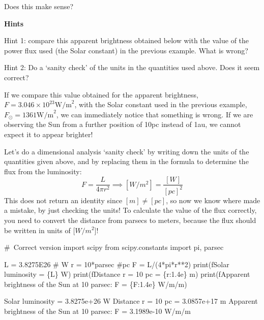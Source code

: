 \documentclass[
  letterpaper,
  DIV=11,
  numbers=noendperiod]{scrreprt}
\newenvironment{Shaded}{\begin{snugshade}}{\end{snugshade}}
\newcommand{\BuiltInTok}[1]{\textcolor[rgb]{0.00,0.23,0.31}{#1}}
\newcommand{\CommentTok}[1]{\textcolor[rgb]{0.37,0.37,0.37}{#1}}
\newcommand{\DecValTok}[1]{\textcolor[rgb]{0.68,0.00,0.00}{#1}}
\newcommand{\FloatTok}[1]{\textcolor[rgb]{0.68,0.00,0.00}{#1}}
\newcommand{\ImportTok}[1]{\textcolor[rgb]{0.00,0.46,0.62}{#1}}
\newcommand{\NormalTok}[1]{\textcolor[rgb]{0.00,0.23,0.31}{#1}}
\newcommand{\OperatorTok}[1]{\textcolor[rgb]{0.37,0.37,0.37}{#1}}
\newcommand{\SpecialCharTok}[1]{\textcolor[rgb]{0.37,0.37,0.37}{#1}}
\newcommand{\SpecialStringTok}[1]{\textcolor[rgb]{0.13,0.47,0.30}{#1}}
\begin{document}
Does this make sense?

\textbf{Hints}

Hint 1: compare this apparent brightness obtained below with the value
of the power flux used (the Solar constant) in the previous example.
What is wrong?

Hint 2: Do a `sanity check' of the units in the quantities used above.
Does it seem correct?

If we compare this value obtained for the apparent brightness,
\(F=3.046\times 10^{23} \mathrm{W/m}^2\), with the Solar constant used
in the previous example, \(F_\odot = 1361 \mathrm{W/m}^2\), we can
immediately notice that something is wrong. If we are observing the Sun
from a further position of 10pc instead of 1au, we cannot expect it to
appear brighter!

Let's do a dimensional analysis `sanity check' by writing down the units
of the quantities given above, and by replacing them in the formula to
determine the flux from the luminosity:
\[ F=\frac{L}{4\pi r^2} \implies [W/m^2] = \frac{[W]}{[pc]^2} \] This
does not return an identity since \([m]\neq [pc]\), so now we know where
made a mistake, by just checking the units! To calculate the value of
the flux correctly, you need to convert the distance from parsecs to
meters, because the flux should be written in units of {[}\(W/m^2\){]}!

\begin{Shaded}
\begin{Highlighting}[]
\CommentTok{\# Correct version}
\ImportTok{import}\NormalTok{ scipy}
\ImportTok{from}\NormalTok{ scipy.constants }\ImportTok{import}\NormalTok{ pi, parsec}

\NormalTok{L }\OperatorTok{=} \FloatTok{3.8275E26} \CommentTok{\# W}
\NormalTok{r }\OperatorTok{=} \DecValTok{10}\OperatorTok{*}\NormalTok{parsec }\CommentTok{\#pc}
\NormalTok{F }\OperatorTok{=}\NormalTok{ L}\OperatorTok{/}\NormalTok{(}\DecValTok{4}\OperatorTok{*}\NormalTok{pi}\OperatorTok{*}\NormalTok{r}\OperatorTok{**}\DecValTok{2}\NormalTok{)}
\BuiltInTok{print}\NormalTok{(}\SpecialStringTok{f\textquotesingle{}Solar luminosity = }\SpecialCharTok{\{}\NormalTok{L}\SpecialCharTok{\}}\SpecialStringTok{ W\textquotesingle{}}\NormalTok{)}
\BuiltInTok{print}\NormalTok{(}\SpecialStringTok{f\textquotesingle{}Distance r = 10 pc = }\SpecialCharTok{\{}\NormalTok{r}\SpecialCharTok{:1.4e\}}\SpecialStringTok{ m\textquotesingle{}}\NormalTok{)}
\BuiltInTok{print}\NormalTok{(}\SpecialStringTok{f\textquotesingle{}Apparent brightness of the Sun at 10 parsec: F = }\SpecialCharTok{\{}\NormalTok{F}\SpecialCharTok{:1.4e\}}\SpecialStringTok{ W/m/m\textquotesingle{}}\NormalTok{)}

\NormalTok{Solar luminosity }\OperatorTok{=} \FloatTok{3.8275e+26}\NormalTok{ W}
\NormalTok{Distance r }\OperatorTok{=} \DecValTok{10}\NormalTok{ pc }\OperatorTok{=} \FloatTok{3.0857e+17}\NormalTok{ m}
\NormalTok{Apparent brightness of the Sun at }\DecValTok{10}\NormalTok{ parsec: F }\OperatorTok{=} \FloatTok{3.1989e{-}10}\NormalTok{ W}\OperatorTok{/}\NormalTok{m}\OperatorTok{/}\NormalTok{m}
\end{Highlighting}
\end{Shaded}
\end{document}
